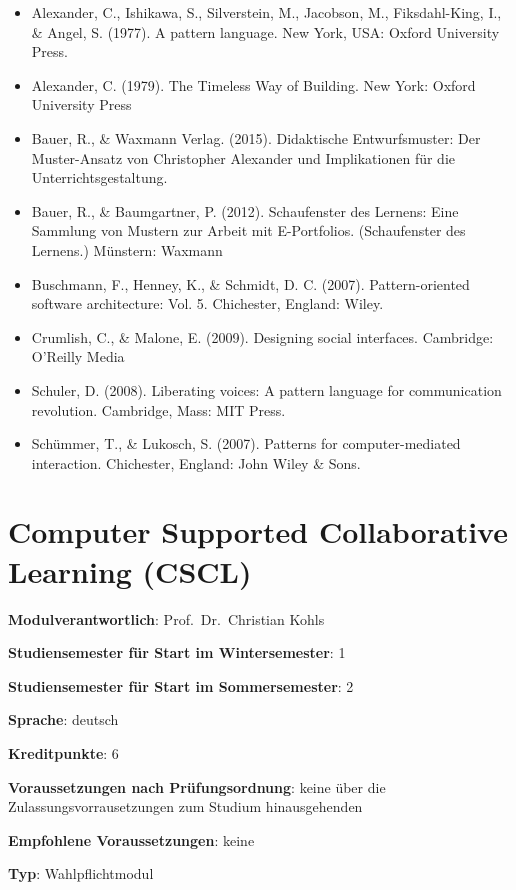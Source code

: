 \begin{itemize}
\tightlist
\item
  Alexander, C., Ishikawa, S., Silverstein, M., Jacobson, M.,
  Fiksdahl-King, I., \& Angel, S. (1977). A pattern language. New York,
  USA: Oxford University Press.
\item
  Alexander, C. (1979). The Timeless Way of Building. New York: Oxford
  University Press
\item
  Bauer, R., \& Waxmann Verlag. (2015). Didaktische Entwurfsmuster: Der
  Muster-Ansatz von Christopher Alexander und Implikationen für die
  Unterrichtsgestaltung.
\item
  Bauer, R., \& Baumgartner, P. (2012). Schaufenster des Lernens: Eine
  Sammlung von Mustern zur Arbeit mit E-Portfolios. (Schaufenster des
  Lernens.) Münstern: Waxmann
\item
  Buschmann, F., Henney, K., \& Schmidt, D. C. (2007). Pattern-oriented
  software architecture: Vol. 5. Chichester, England: Wiley.
\item
  Crumlish, C., \& Malone, E. (2009). Designing social interfaces.
  Cambridge: O'Reilly Media
\item
  Schuler, D. (2008). Liberating voices: A pattern language for
  communication revolution. Cambridge, Mass: MIT Press.
\item
  Schümmer, T., \& Lukosch, S. (2007). Patterns for computer-mediated
  interaction. Chichester, England: John Wiley \& Sons.
\end{itemize}

\chapter{Computer Supported Collaborative Learning
(CSCL)\label{/mi-2017/modulbeschreibungen-master/MA_SC_WPF_CSCL}}\label{computer-supported-collaborative-learning-csclpathlabelmi-2017modulbeschreibungen-mastermaux5fscux5fwpfux5fcscl}

\begin{modulHead}
\textbf{Modulverantwortlich}: Prof.~Dr.~Christian
Kohls
\end{modulHead}
\begin{modulHead}
\textbf{Studiensemester für
Start im Wintersemester}:
1
\end{modulHead}
\begin{modulHead}
\textbf{Studiensemester für Start
im Sommersemester}:
2
\end{modulHead}
\begin{modulHead}
\textbf{Sprache}:
deutsch
\end{modulHead}
\begin{modulHead}
\textbf{Kreditpunkte}:
6
\end{modulHead}
\begin{modulHead}
\textbf{Voraussetzungen nach
Prüfungsordnung}: keine über die Zulassungsvorrausetzungen zum Studium
hinausgehenden
\end{modulHead}
\begin{modulHead}
\textbf{Empfohlene
Voraussetzungen}: keine
\end{modulHead}
\begin{modulHead}
\textbf{Typ}:
Wahlpflichtmodul
\end{modulHead}


